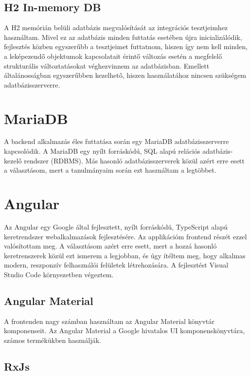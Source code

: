 \documentclass[a4paper,12pt]{report}
\theoremstyle{definition}
\theoremstyle{remark}
\begin{document}
	\subsection{H2 In-memory DB}

A H2\cite{H2website} memórián belüli adatbázis megvalósítását az integrációs tesztjeimhez használtam. Mivel ez az adatbázis minden futtatás esetében újra inicializálódik, fejlesztés közben egyszerűbb a tesztjeimet futtatnom, hiszen így nem kell minden, a leképezendő objektumok kapcsolatait érintő változás esetén a megfelelő strukturális változtatásokat véghezvinnem az adatbázisban. Emellett általánosságban egyszerűbben kezelhető, hiszen használatához nincsen szükségem adatbázisszerverre.

\section{MariaDB}

A backend alkalmazás éles futtatása során egy MariaDB\cite{Mariawebsite} adatbázisszerverre kapcsolódik. A MariaDB egy nyílt forráskódú, SQL alapú relációs adatbázis-kezelő rendszer (RDBMS). Más hasonló adatbázisszerverek közül azért erre esett a választásom, mert a tanulmányaim során ezt használtam a legtöbbet.

\section{Angular}

Az Angular\cite{Angularwebsite} egy Google által fejlesztett, nyílt forráskódú, TypeScript alapú keretrendszer webalkalmazások fejlesztésére. Az applikációm frontend részét ezzel valósítottam meg. A választásom azért erre esett, mert a hozzá hasonló keretrenszerek közül ezt ismerem a legjobban, és úgy ítéltem meg, hogy alkalmas modern, reszponzív felhasználói felületek létrehozására. A fejlesztést Visual Studio Code\cite{VSCwebsite} környezetben végeztem.

	\subsection{Angular Material}

A frontenden nagy számban használtam az Angular Material\cite{Materialwebsite} könyvtár komponenseit. Az Angular Material a Google hivatalos UI komponenskönyvtára, számos termékükben használják.

	\subsection{RxJs}
\end{document}
